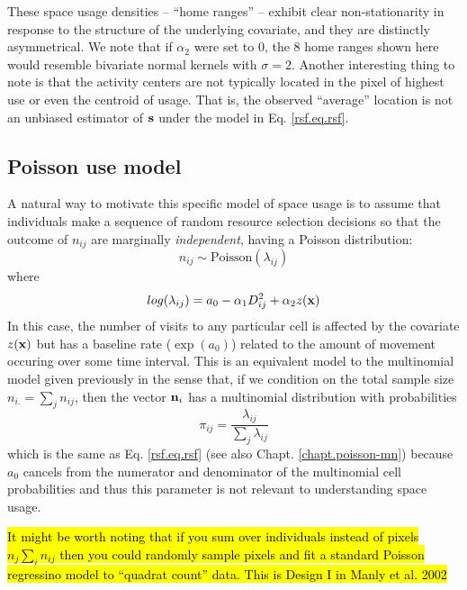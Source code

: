 These space usage densities -- ``home ranges'' -- exhibit clear
non-stationarity in response to the structure of the underlying
covariate, and they are distinctly asymmetrical.  We note that if
$\alpha_{2}$ were set to 0, the 8 home ranges shown here would
resemble bivariate normal kernels with $\sigma = 2$.  Another
interesting thing to note is that the activity centers are not
typically located in the pixel of highest use or even the centroid of
usage. That is, the observed ``average'' location is not an unbiased
estimator of ${\bf s}$ under the model in Eq. \ref{rsf.eq.rsf}.


\subsection{Poisson use model}

A natural way to motivate this specific model of space usage is to
assume that individuals make a sequence of random resource selection
decisions so that the outcome of $n_{ij}$ are marginally {\it
  independent}, having a Poisson distribution:
\[
 n_{ij} \sim \mbox{Poisson}( \lambda_{ij})
\]
where
\[
 log(\lambda_{ij}) = a_{0} -\alpha_{1} D_{ij}^{2} +  \alpha_{2} z({\bf x})
\]
In this case, the number of visits to any particular cell is affected
by the covariate $z({\bf x})$ but has a baseline rate ($\exp(a_{0})$)
related to the amount of movement occuring over some time interval.
This is an equivalent model to the multinomial
model given previously in the sense that, if we condition on the total
sample size $n_{i.} = \sum_{j} n_{ij}$, then the vector ${\bf n}_{i}$
has a multinomial distribution with probabilities
\[
 \pi_{ij} = \frac{\lambda_{ij}}{ \sum_{j} \lambda_{ij}}
\]
which is the same as Eq. \ref{rsf.eq.rsf} (see also
Chapt. \ref{chapt.poisson-mn}) because $a_{0}$ cancels
from the numerator and denominator of the
multinomial cell probabilities
and thus this parameter is not relevant to understanding
space usage.

\hl{It might be worth noting that if you sum over individuals instead
  of pixels $n_j \sum_i n_{ij}$ then you could randomly sample pixels
  and fit a standard Poisson regressino model to ``quadrat count''
  data. This is Design I in Manly et al. 2002}

